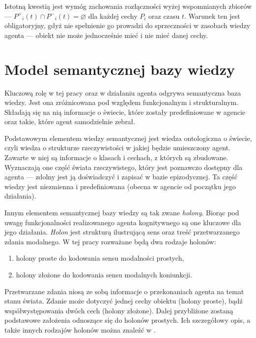 Istotną kwestią jest wymóg zachowania rozłączności wyżej wspomnianych zbiorów --- 
$ P^+{}_i(t) \cap P^-{}_i(t) = \varnothing $
dla każdej cechy $ P_i $ oraz czasu $ t $. Warunek ten jest obligatoryjny, gdyż nie spełnienie go prowadzi do sprzeczności w zasobach wiedzy agenta --- obiekt nie może jednocześnie mieć i nie mieć danej cechy.


\section{Model semantycznej bazy wiedzy}

Kluczową rolę w tej pracy oraz w działaniu agenta odgrywa semantyczna baza wiedzy. Jest ona zróżnicowana pod względem funkcjonalnym i strukturalnym. Składają się na nią informacje o świecie, które zostały predefiniowane w agencie oraz takie, które agent samodzielnie zebrał.

Podstawowym elementem wiedzy semantycznej jest wiedza ontologiczna o świecie, czyli wiedza o strukturze rzeczywistości w jakiej będzie umieszczony agent. Zawarte w niej są informacje o klasach i cechach, z których są zbudowane. Wyznaczają one część świata rzeczywistego, który jest poznawczo dostępny dla agenta --- zdolny jest ją doświadczyć i zapisać w bazie epizodycznej. Ta część wiedzy jest niezmienna i predefiniowana (obecna w agencie od początku jego działania).

Innym elementem semantycznej bazy wiedzy są tak zwane \textit{holony}. Biorąc pod uwagę funkcjonalności realizowanego agenta kognitywnego są one kluczowe dla jego działania. \textit{Holon} jest strukturą ilustrującą sens oraz treść przetwarzanego zdania modalnego. W tej pracy rozważane będą dwa rodzaje holonów: 

\begin{enumerate}
	\setlength{\itemindent}{.5in}
	\item holony proste do kodowania sensu modalności prostych,
	\item holony złożone do kodowania sensu modalnych koniunkcji.
\end{enumerate}

Przetwarzane zdania niosą ze sobą informacje o przekonaniach agenta na temat stanu świata. Zdanie może dotyczyć jednej cechy obiektu (holony proste), bądź współwystępowania dwóch cech (holony złożone). Dalej przybliżone zostaną podstawowe założenia odnoszące się do holonów prostych. Ich szczegółowy opis, a także innych rodzajów holonów można znaleźć w \cite{raport}.

